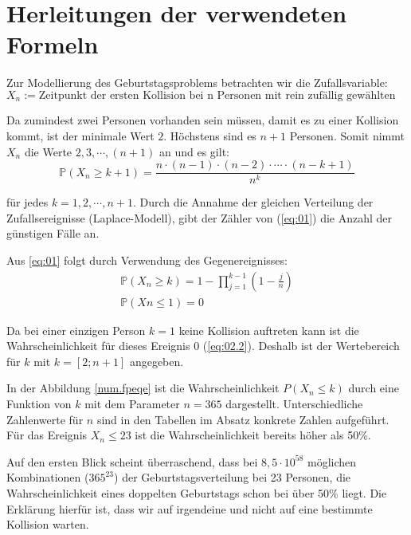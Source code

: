 \documentclass[../main.tex]{subfiles}
\begin{document}
\section{Herleitungen der verwendeten Formeln}
\begin{flushleft}
Zur Modellierung des Geburtstagsproblems betrachten wir die Zufallsvariable:
    \begin{equation}
      X_{ n } := \text{Zeitpunkt der ersten Kollision bei n Personen mit rein zufällig gewählten Geburtstagen} \label {first}
    \end{equation}


Da zumindest zwei Personen vorhanden sein müssen, damit es zu einer Kollision kommt, ist der minimale Wert $2$. Höchstens sind es $n + 1$ Personen. Somit nimmt $X_{ n }$ die Werte $2,3,\cdots ,(n+1)$ an und es gilt:
   \begin{equation}  \label{eq:01}
   \mathbb{P}(X_{ n } \geq k + 1)  = \frac{ n \cdot (n - 1) \cdot (n - 2) \cdot \cdots \cdot (n - k + 1) }{ n^k }
    \end{equation}

für jedes $k = 1,2,\cdots,n + 1$. Durch die Annahme der gleichen Verteilung der Zufallsereignisse (Laplace-Modell), gibt der Zähler von (\ref{eq:01}) die Anzahl der günstigen Fälle an. \newline

Aus \ref{eq:01} folgt durch Verwendung des Gegenereignisses:
\begin{eqnarray}
\mathbb{P}(X_{ n } \geq k) = 1 - \prod_{ j=1 }^{k-1}{ (1 - \frac{ j }{ n }) }  \label{eq:02.1} \\
\mathbb{P}(Xn\leq 1) = 0  \label{eq:02.2}
\end{eqnarray}

Da bei einer einzigen Person $k = 1$ keine Kollision auftreten kann ist die Wahrscheinlichkeit für dieses Ereignis 0 (\ref{eq:02.2}). Deshalb ist der Wertebereich für $k$ mit $k = [2;n+1]$ angegeben. \newline

In der Abbildung \ref{num.fpeqe} ist die Wahrscheinlichkeit $P(X_{n} \leq k)$ durch eine Funktion von $k$ mit dem Parameter $n = 365$ dargestellt. Unterschiedliche Zahlenwerte für $n$ sind in den Tabellen im Absatz konkrete Zahlen aufgeführt. Für das Ereignis $ X_{n} \leq 23 $ ist die Wahrscheinlichkeit bereits höher als 50\%. \newline

Auf den ersten Blick scheint überraschend, dass bei $8,5 \cdot 10^{58}$ möglichen Kombinationen ($365^{23}$) der Geburtstagsverteilung bei 23 Personen, die Wahrscheinlichkeit eines doppelten Geburtstags schon bei über 50\% liegt.
Die Erklärung hierfür ist, dass wir auf irgendeine und nicht auf eine bestimmte Kollision warten.



\end{flushleft}
\end{document}
